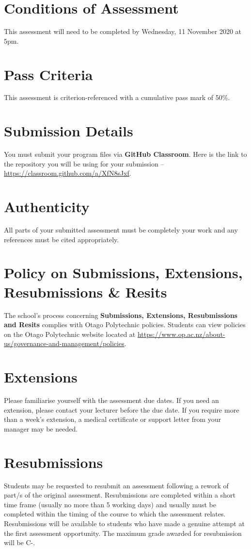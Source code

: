 \documentclass{article}
\begin{document}
\section*{Conditions of Assessment}
This assessment will need to be completed by Wednesday, 11 November 2020 at 5pm.

\section*{Pass Criteria}
This assessment is criterion-referenced with a cumulative pass mark of 50\%.

\section*{Submission Details}
You must submit your program files via \textbf{GitHub Classroom}. Here is the link to the repository you will be using for your submission – \href{https://classroom.github.com/a/XfN8sJxf}{https://classroom.github.com/a/XfN8sJxf}.

\section*{Authenticity}
All parts of your submitted assessment must be completely your work and any references must be cited appropriately.

\section*{Policy on Submissions, Extensions, Resubmissions \& Resits}
The school's process concerning \textbf{Submissions, Extensions, Resubmissions and Resits} complies with Otago Polytechnic policies. Students can view policies on the Otago Polytechnic website located at \href{https://www.op.ac.nz/about-us/governance-and-management/policies}{https://www.op.ac.nz/about-us/governance-and-management/policies}.

\section*{Extensions}
Please familiarise yourself with the assessment due dates. If you need an extension, please contact your lecturer before the due date. If you require more than a week's extension, a medical certificate or support letter from your manager may be needed.

\section*{Resubmissions}
Students may be requested to resubmit an assessment following a rework of part/s of the original assessment. Resubmissions are completed within a short time frame (usually no more than 5 working days) and usually must be completed within the timing of the course to which the assessment relates. Resubmissions will be available to students who have made a genuine attempt at the first assessment opportunity. The maximum grade awarded for resubmission will be C-.
\end{document}
